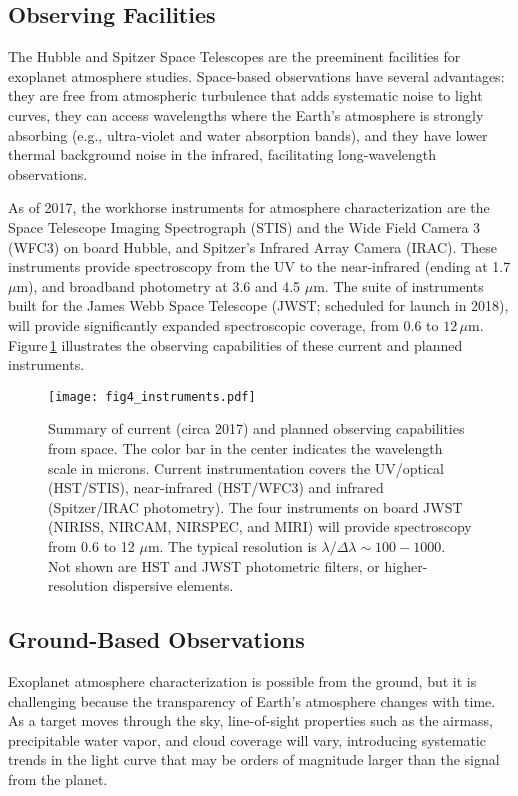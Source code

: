 \documentclass[graybox,natbib,nosecnum]{svmult}
\begin{document}
\subsection{Observing Facilities}
The Hubble and Spitzer Space Telescopes are the preeminent facilities for exoplanet atmosphere studies.  Space-based observations have several advantages: they are free from atmospheric turbulence that adds systematic noise to light curves, they can access wavelengths where the Earth's atmosphere is strongly absorbing (e.g., ultra-violet and water absorption bands), and they have lower thermal background noise in the infrared, facilitating long-wavelength observations. 

As of 2017, the workhorse instruments for atmosphere characterization are the Space Telescope Imaging Spectrograph (STIS) and the Wide Field Camera 3 (WFC3) on board Hubble, and Spitzer's Infrared Array Camera (IRAC).  These instruments provide spectroscopy from the UV to the near-infrared (ending at 1.7 $\mu$m), and broadband photometry at 3.6 and 4.5 $\mu$m. The suite of instruments built for the James Webb Space Telescope (JWST; scheduled for launch in 2018), will provide significantly expanded spectroscopic coverage, from $0.6$ to $12\,\mu$m.  Figure\,\ref{fig:instruments} illustrates the observing capabilities of these current and planned instruments. 

\begin{figure}
\begin{centering}
\texttt{[image: fig4\_instruments.pdf]}
\caption{Summary of current (circa 2017) and planned observing capabilities from space. The color bar in the center indicates the wavelength scale in microns. Current instrumentation covers the UV/optical (HST/STIS), near-infrared (HST/WFC3) and infrared (Spitzer/IRAC photometry). The four instruments on board JWST (NIRISS, NIRCAM, NIRSPEC, and MIRI) will provide spectroscopy from 0.6 to 12 $\mu$m. The typical resolution is $\lambda/\Delta \lambda \sim100 - 1000$. Not shown are HST and JWST photometric filters, or higher-resolution dispersive elements.}
\label{fig:instruments}       
\end{centering}
\end{figure}


\subsection{Ground-Based Observations}
Exoplanet atmosphere characterization is possible from the ground, but it is challenging because
the transparency of Earth's atmosphere changes with time.  As a target moves through the sky, line-of-sight properties such as the airmass, precipitable water vapor, and cloud coverage will vary, introducing systematic trends in the light curve that may be orders of magnitude larger than the signal from the planet. 
\end{document}
